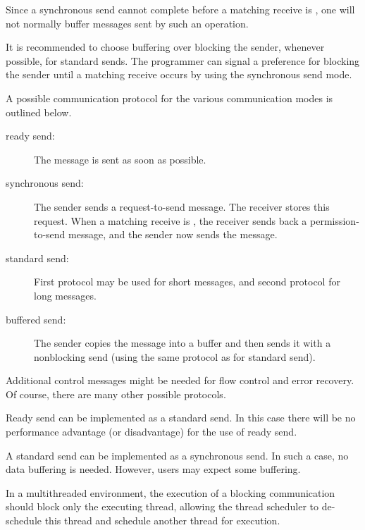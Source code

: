 \begin{implementors}
Since a synchronous send cannot complete before a matching receive is ,
one will not normally buffer messages sent by such an operation.

It is recommended to choose buffering over blocking the sender, whenever
possible, for standard sends.  The programmer can signal a preference
for blocking the sender until a matching receive occurs by using the
synchronous send mode.

A possible communication protocol for the various communication modes
is outlined below.

\begin{description}
\item[ready send:]The message is sent as soon as possible.

\item[synchronous send:]The sender sends a request-to-send message.
The receiver stores this request.
When a matching receive is , the receiver sends back a permission-to-send
message, and the sender now sends the message.

\item[standard send:]First protocol may be used for short messages, and second protocol for
long messages.

\item[buffered send:]The sender copies the message into a buffer and then sends it with a
nonblocking send (using the same protocol as for standard send).
\end{description}

Additional control messages might be needed for flow control and error
recovery.  Of course, there are many other possible protocols.

Ready send can be implemented as a standard send. In this case
there will be no performance advantage (or disadvantage) for the use of
ready send.

A standard send can be implemented as a synchronous send.
In such a case, no data buffering is needed.  However,
users may
expect some buffering.

In a multithreaded environment, the execution of a blocking communication
should block only the executing thread, allowing the thread scheduler to
de-schedule this thread and schedule another thread for execution.
\end{implementors}


